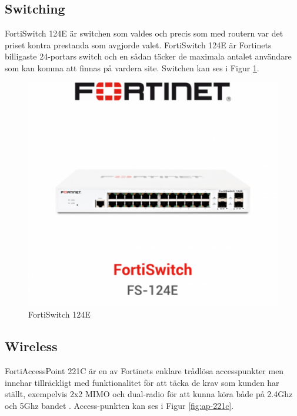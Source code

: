 \subsection{Switching}
    FortiSwitch 124E är switchen som valdes och precis som med routern var det priset kontra prestanda som avgjorde valet. FortiSwitch 124E är Fortinets billigaste 24-portars switch och en sådan täcker de maximala antalet användare som kan komma att finnas på vardera site. Switchen kan ses i Figur \ref{fig:switch-124e}.
    
    \begin{figure}[htb]
        \centering
        \includegraphics[width=\textwidth,trim={0 5cm 0 5cm}, clip]{pics/FortiSwitch-124E_icon_600x600.pdf}
        \caption{FortiSwitch 124E}
        \label{fig:switch-124e}
    \end{figure}

\newpage
\subsection{Wireless}
    FortiAccessPoint 221C är en av Fortinets enklare trådlösa accesspunkter men innehar tillräckligt med funktionalitet för att täcka de krav som kunden har ställt, exempelvis 2x2 MIMO och dual-radio för att kunna köra både på 2.4Ghz och 5Ghz bandet \cite{FN_FortiAP}. Access-punkten kan ses i Figur \ref{fig:ap-221c}.
    
